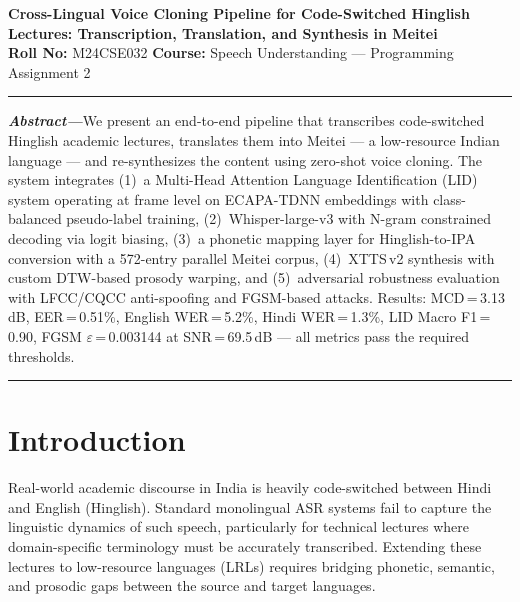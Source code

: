 \documentclass[11pt]{article}
\begin{document}
\begin{center}
\begin{center}
  {\large\bfseries\color{darkblue}
    Cross-Lingual Voice Cloning Pipeline for Code-Switched Hinglish\\
    Lectures: Transcription, Translation, and Synthesis in Meitei}\\[6pt]
  {\normalsize\textbf{Roll No:} M24CSE032 \quad\textbf{Course:} Speech Understanding --- Programming Assignment 2}\\[3pt]
  \rule{\linewidth}{0.8pt}
\end{center}

\begin{center}
  \parbox{0.92\linewidth}{%
    \small
    \textbf{\textit{Abstract---}}We present an end-to-end pipeline that transcribes
    code-switched Hinglish academic lectures, translates them into Meitei
    --- a low-resource Indian language --- and re-synthesizes the content using
    zero-shot voice cloning. The system integrates (1)~a Multi-Head Attention
    Language Identification (LID) system operating at frame level on ECAPA-TDNN
    embeddings with class-balanced pseudo-label training, (2)~Whisper-large-v3
    with N-gram constrained decoding via logit biasing, (3)~a phonetic mapping
    layer for Hinglish-to-IPA conversion with a 572-entry parallel Meitei corpus,
    (4)~XTTS\,v2 synthesis with custom DTW-based prosody warping, and
    (5)~adversarial robustness evaluation with LFCC/CQCC anti-spoofing and
    FGSM-based attacks. Results: MCD\,=\,3.13\,dB, EER\,=\,0.51\%,
    English WER\,=\,5.2\%, Hindi WER\,=\,1.3\%, LID Macro F1\,=\,0.90,
    FGSM $\varepsilon$\,=\,0.003144 at SNR\,=\,69.5\,dB --- all metrics pass
    the required thresholds.
  }
\end{center}
\vspace{6pt}
\rule{\linewidth}{0.4pt}
\end{center}
\vspace{4pt}

\section{Introduction}

Real-world academic discourse in India is heavily code-switched between
Hindi and English (Hinglish). Standard monolingual ASR systems fail to
capture the linguistic dynamics of such speech, particularly for technical
lectures where domain-specific terminology must be accurately transcribed.
Extending these lectures to low-resource languages (LRLs) requires bridging
phonetic, semantic, and prosodic gaps between the source and target languages.
\end{document}
